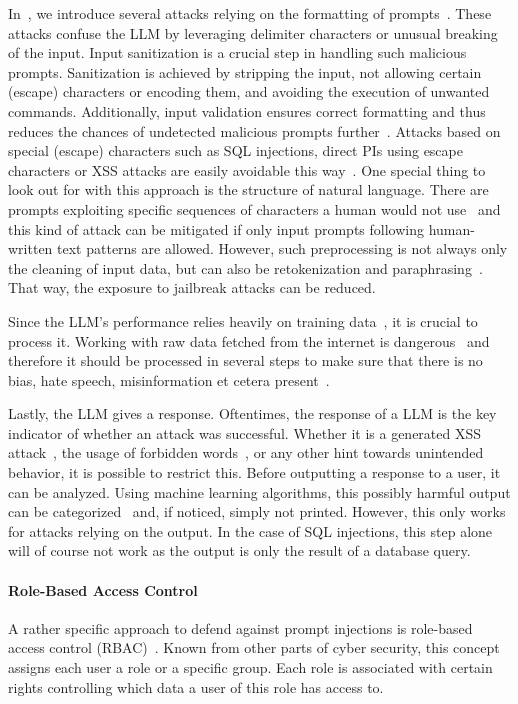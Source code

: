 In~, we introduce several attacks relying on the formatting of prompts~\cite{10.1145/3605764.3623985, perez2022ignore, liu2023prompt}. These attacks confuse the LLM by leveraging delimiter characters or unusual breaking of the input. Input sanitization is a crucial step in handling such malicious prompts. Sanitization is achieved by stripping the input, not allowing certain (escape) characters or encoding them, and avoiding the execution of unwanted commands. Additionally, input validation ensures correct formatting and thus reduces the chances of undetected malicious prompts further~\cite{10.1145/2351676.2351733}. Attacks based on special (escape) characters such as SQL injections, direct PIs using escape characters or XSS attacks are easily avoidable this way~\cite{halfond2006classification, gupta2015predicting}. 
One special thing to look out for with this approach is the structure of natural language. 
There are prompts exploiting specific sequences of characters a human would not use~\cite{perez2022ignore, liu2023prompt} and this kind of attack can be mitigated if only input prompts following human-written text patterns are allowed.
However, such preprocessing is not always only the cleaning of input data, but can also be retokenization and paraphrasing~\cite{kirchenbauer2023reliability}. That way, the exposure to jailbreak attacks can be reduced.

Since the LLM's performance relies heavily on training data~\cite{weidinger2021ethical}, it is crucial to process it. Working with raw data fetched from the internet is dangerous~\cite{gehman2020realtoxicityprompts} and therefore it should be processed in several steps to make sure that there is no bias, hate speech, misinformation et cetera present~\cite{penedo2023refinedweb}.

Lastly, the LLM gives a response. Oftentimes, the response of a LLM is the key indicator of whether an attack was successful. Whether it is a generated XSS attack~\cite{XSS}, the usage of forbidden words~\cite{wei2023jailbroken}, or any other hint towards unintended behavior, it is possible to restrict this. Before outputting a response to a user, it can be analyzed. Using machine learning algorithms, this possibly harmful output can be categorized~\cite{wang2019improving} and, if noticed, simply not printed. However, this only works for attacks relying on the output. In the case of SQL injections, this step alone will of course not work as the output is only the result of a database query. 

\paragraph{Role-Based Access Control}
A rather specific approach to defend against prompt injections is role-based access control (RBAC)~\cite{SANDHU1998237}. 
Known from other parts of cyber security, this concept assigns each user a role or a specific group.
Each role is associated with certain rights controlling which data a user of this role has access to.

